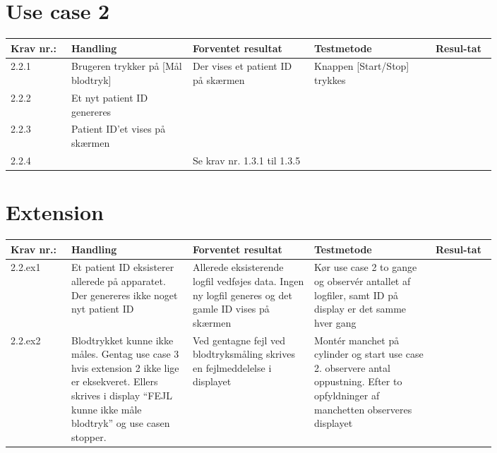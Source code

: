 \section{Use case 2}
		\begin{longtable}{|p{0.1\linewidth}|p{0.2\linewidth}|p{0.2\linewidth}|p{0.2\linewidth}|p{0.1\linewidth}|}
			\hline
			Krav nr.: & Handling & Forventet resultat & Testmetode & Resul-tat  \\\hline
			2.2.1 & Brugeren trykker på [Mål blodtryk] & \multirow{3}{\linewidth}{Der vises et patient ID på skærmen} & \multirow{3}{\linewidth}{Knappen [Start/Stop] trykkes} & \multirow{3}{\linewidth}{}  \\ \cline{1-2} 
			2.2.2 & Et nyt patient ID genereres & & &  \\ \cline{1-2}
			2.2.3 & Patient ID’et vises på skærmen & & &  \\ \hline
			2.2.4 & & \multicolumn{3}{l|}{Se krav nr. 1.3.1 til 1.3.5} \\ 
			\hline
			
		\end{longtable}
	
	\section*{Extension}
		\begin{longtable}{|p{0.1\linewidth}|p{0.2\linewidth}|p{0.2\linewidth}|p{0.2\linewidth}|p{0.1\linewidth}|}
			\hline
			Krav nr.: & Handling & Forventet resultat & Testmetode & Resul-tat  \\\hline
			2.2.ex1 & Et patient ID eksisterer allerede på apparatet. Der genereres ikke noget nyt patient ID & Allerede eksisterende logfil vedføjes data. Ingen ny logfil generes og det gamle ID vises på skærmen & Kør use case 2 to gange og observér antallet af logfiler, samt ID på display er det samme hver gang &  \\ \hline
			2.2.ex2 & Blodtrykket kunne ikke måles. Gentag use case 3 hvis extension 2 ikke lige er eksekveret. Ellers skrives i display “FEJL kunne ikke måle blodtryk” og use casen stopper.  & Ved gentagne fejl ved blodtryksmåling skrives en fejlmeddelelse i displayet & Montér manchet på cylinder og start use case 2. observere antal oppustning. Efter to opfyldninger af manchetten observeres displayet & \\ \hline
		\end{longtable}